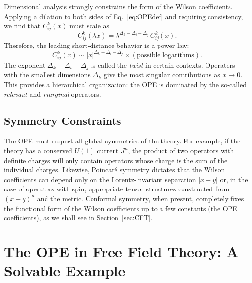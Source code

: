 \documentclass[11pt]{article}
\begin{document}
Dimensional analysis strongly constrains the form of the Wilson coefficients. Applying a dilation to both sides of Eq.~\eqref{eq:OPEdef} and requiring consistency, we find that $C_{ij}^k(x)$ must scale as
\begin{equation}
C_{ij}^k(\lambda x) = \lambda^{\Delta_k - \Delta_i - \Delta_j} \, C_{ij}^k(x).
\end{equation}
Therefore, the leading short-distance behavior is a power law:
\begin{equation}
C_{ij}^k(x) \sim |x|^{\Delta_k - \Delta_i - \Delta_j} \times (\text{possible logarithms}).
\label{eq:scaling}
\end{equation}
The exponent $\Delta_k - \Delta_i - \Delta_j$ is called the \emph{twist} in certain contexts. Operators with the smallest dimensions $\Delta_k$ give the most singular contributions as $x \to 0$. This provides a hierarchical organization: the OPE is dominated by the so-called \emph{relevant} and \emph{marginal} operators.

\subsection{Symmetry Constraints}
The OPE must respect all global symmetries of the theory. For example, if the theory has a conserved $U(1)$ current $J^\mu$, the product of two operators with definite charges will only contain operators whose charge is the sum of the individual charges. Likewise, Poincaré symmetry dictates that the Wilson coefficients can depend only on the Lorentz-invariant separation $|x-y|$ or, in the case of operators with spin, appropriate tensor structures constructed from $(x-y)^\mu$ and the metric. Conformal symmetry, when present, completely fixes the functional form of the Wilson coefficients up to a few constants (the OPE coefficients), as we shall see in Section~\ref{sec:CFT}.

\section{The OPE in Free Field Theory: A Solvable Example}
\label{sec:freefield}
\end{document}
